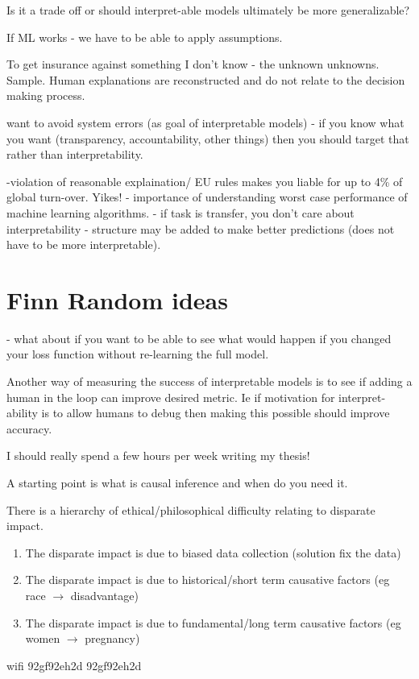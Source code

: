 \documentclass{article}
\theoremstyle{plain}
\theoremstyle{definition}
\begin{document}
Is it a trade off or should interpret-able models ultimately be more generalizable?  

If ML works - we have to be able to apply assumptions. 

To get insurance against something I don't know - the unknown unknowns. Sample. 
Human explanations are reconstructed and do not relate to the decision making process. 

want to avoid system errors (as goal of interpretable models)
- if you know what you want (transparency, accountability, other things) then you should target that rather than interpretability. 

-violation of reasonable explaination/ EU rules makes you liable for up to 4\% of global turn-over. Yikes!
- importance of understanding worst case performance of machine learning algorithms. 
- if task is transfer, you don't care about interpretability
- structure may be added to make better predictions (does not have to be more interpretable). 

\section{Finn Random ideas}
- what about if you want to be able to see what would happen if you changed your loss function without re-learning the full model. 


Another way of measuring the success of interpretable models is to see if adding a human in the loop can improve desired metric. Ie if motivation for interpret-ability is to allow humans to debug then making this possible should improve accuracy. 

I should really spend a few hours per week writing my thesis!

A starting point is what is causal inference and when do you need it. 

There is a hierarchy of ethical/philosophical difficulty relating to disparate impact.
\begin{enumerate}
\item The disparate impact is due to biased data collection (solution fix the data)
\item The disparate impact is due to historical/short term causative factors (eg race $\rightarrow$ disadvantage)
\item The disparate impact is due to fundamental/long term causative factors (eg women $\rightarrow$ pregnancy)
\end{enumerate}

wifi 92gf92eh2d
92gf92eh2d
\end{document}
